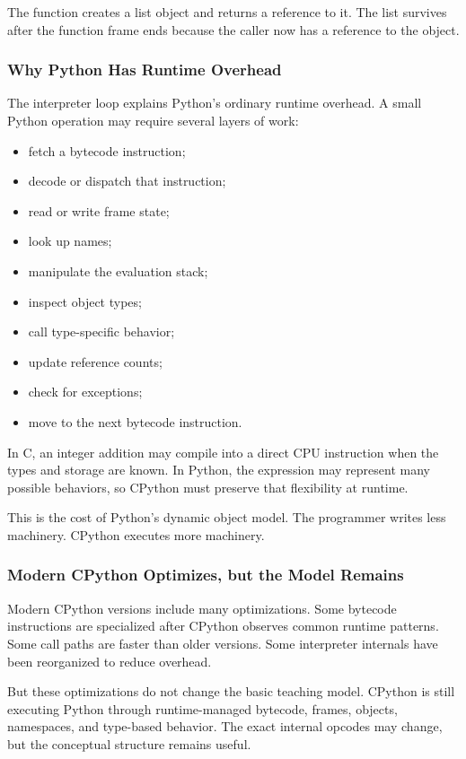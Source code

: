 The function creates a list object and returns a reference to it. The list survives after the function frame ends because the caller now has a reference to the object.

\subsubsection{Why Python Has Runtime Overhead}

The interpreter loop explains Python's ordinary runtime overhead. A small Python operation may require several layers of work:

\begin{itemize}
    \item fetch a bytecode instruction;
    \item decode or dispatch that instruction;
    \item read or write frame state;
    \item look up names;
    \item manipulate the evaluation stack;
    \item inspect object types;
    \item call type-specific behavior;
    \item update reference counts;
    \item check for exceptions;
    \item move to the next bytecode instruction.
\end{itemize}

In C, an integer addition may compile into a direct CPU instruction when the types and storage are known. In Python, the expression may represent many possible behaviors, so CPython must preserve that flexibility at runtime.

This is the cost of Python's dynamic object model. The programmer writes less machinery. CPython executes more machinery.

\subsubsection{Modern CPython Optimizes, but the Model Remains}

Modern CPython versions include many optimizations. Some bytecode instructions are specialized after CPython observes common runtime patterns. Some call paths are faster than older versions. Some interpreter internals have been reorganized to reduce overhead.

But these optimizations do not change the basic teaching model. CPython is still executing Python through runtime-managed bytecode, frames, objects, namespaces, and type-based behavior. The exact internal opcodes may change, but the conceptual structure remains useful.

